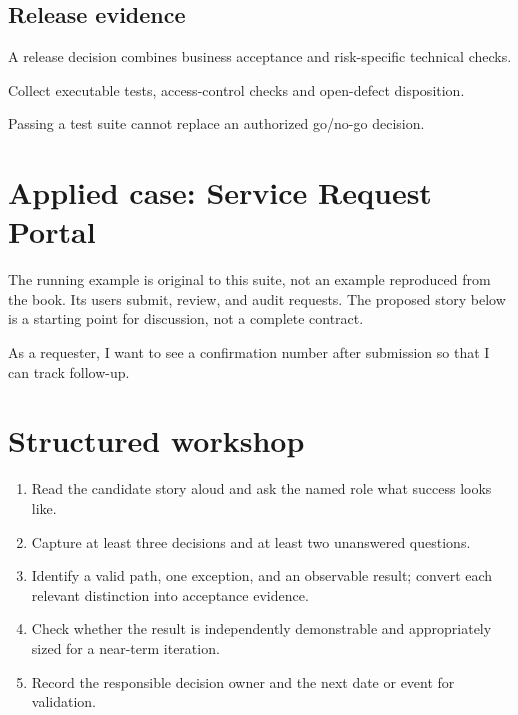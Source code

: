 \documentclass[11pt,letterpaper]{article}
\begin{document}
\subsection{Release evidence}
A release decision combines business acceptance and risk-specific technical checks.

\begin{tcolorbox}[colback=tealback,colframe=navy,title={Engineering translation},breakable]
Collect executable tests, access-control checks and open-defect disposition.

\end{tcolorbox}
\begin{tcolorbox}[colback=amberback,colframe=navy,title={Failure mode to watch},breakable]
Passing a test suite cannot replace an authorized go/no-go decision.

\end{tcolorbox}
\section{Applied case: Service Request Portal}
The running example is original to this suite, not an example reproduced from the book. Its users submit, review, and audit requests. The proposed story below is a starting point for discussion, not a complete contract.

\begin{tcolorbox}[colback=blueback,colframe=navy,title={Candidate story},breakable]
As a requester, I want to see a confirmation number after submission so that I can track follow-up.

\end{tcolorbox}
\section{Structured workshop}
\begin{enumerate}[leftmargin=*,itemsep=3pt]
\item Read the candidate story aloud and ask the named role what success looks like.
\item Capture at least three decisions and at least two unanswered questions.
\item Identify a valid path, one exception, and an observable result; convert each relevant distinction into acceptance evidence.
\item Check whether the result is independently demonstrable and appropriately sized for a near-term iteration.
\item Record the responsible decision owner and the next date or event for validation.
\end{enumerate}
\end{document}
